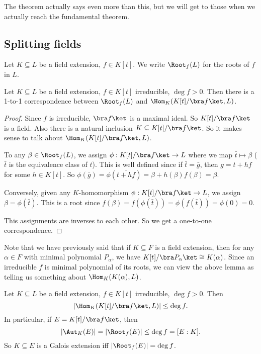 \documentclass[a4paper]{article}
\begin{document}
The theorem actually says even more than this, but we will get to those when we actually reach the fundamental theorem.

\subsection{Splitting fields}
\begin{notation}
  Let $K\subseteq L$ be a field extension, $f\in K[t]$. We write $\Root_f(L)$ for the roots of $f$ in $L$.
\end{notation}

\begin{lemma}
  Let $K\subseteq L$ be a field extension, $f\in K[t]$ irreducible, $\deg f > 0$. Then there is a 1-to-1 correspondence between $\Root_f(L)$ and $\Hom_K(K[t]/\bra f\ket, L)$.
\end{lemma}

\begin{proof}
  Since $f$ is irreducible, $\bra f\ket$ is a maximal ideal. So $K[t] / \bra f\ket$ is a field. Also there is a natural inclusion $K\subseteq K[t] / \bra f\ket$. So it makes sense to talk about $\Hom_K(K[t]/\bra f\ket, L)$.

  To any $\beta\in \Root_f(L)$, we assign $\phi: K[t]/\bra f\ket \to L$ where we map $\bar t \mapsto \beta$ ($\bar t$ is the equivalence class of $t$). This is well defined since if $\bar{t} = \bar{g}$, then $g = t + hf$ for some $h \in K[t]$. So $\phi(\bar{g}) = \phi(\overline{t + hf}) = \beta + h(\beta) f(\beta) = \beta$.

  Conversely, given any $K$-homomorphism $\phi: K[t]/\bra f\ket \to L$, we assign $\beta = \phi(\bar t)$. This is a root since $f(\beta) = f(\phi(\bar t)) = \phi(f(\bar t)) = \phi(0) = 0$.

  This assignments are inverses to each other. So we get a one-to-one correspondence.
\end{proof}
Note that we have previously said that if $K\subseteq F$ is a field extension, then for any $\alpha\in F$ with minimal polynomial $P_\alpha$, we have $K[t]/\bra P_\alpha\ket \cong K(\alpha)$. Since an irreducible $f$ is minimal polynomial of its roots, we can view the above lemma as telling us something about $\Hom_K(K(\alpha), L)$.

\begin{cor}
  Let $K\subseteq L$ be a field extension, $f \in K[t]$ irreducible, $\deg f > 0$. Then
  \[
    \left| \Hom_K(K[t]/\bra f\ket, L) \right| \leq \deg f.
  \]
  In particular, if $E = K[t]/\bra f\ket$, then
  \[
    |\Aut_K(E)| = |\Root_f(E)| \leq \deg f = [E:K].
  \]
  So $K \subseteq E$ is a Galois extension iff $|\Root_f(E)| = \deg f$.
\end{cor}
\end{document}
